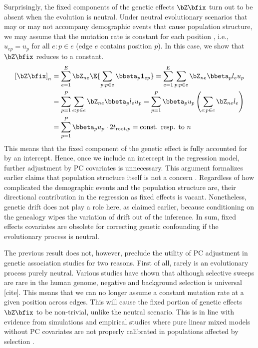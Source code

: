 Surprisingly, the fixed components of the genetic effects $\bZ\bfix$ turn out to be absent when the evolution is neutral.
Under neutral evolutionary scenarios that may or may not accompany demographic events that cause population structure, 
we may assume that the mutation rate is constant for each position \citep{wakeley2008coalescent, durrett2008probabilitydna},
i.e., $u_{ep} = u_p$ for all $e: p\in e$ (edge $e$ contains position $p$). 
In this case, we show that $\bZ\bfix$ reduces to a constant.
\begin{align} 
    \begin{aligned}
        \left[\bZ \bfix \right]_n 
        &= \sum_{e=1}^E \bZ_{ne} \E{ \sum_{p:p\in e} \bbeta_p \mathbf{1}_{ep}}  
        = \sum_{e=1}^E \sum_{p:p\in e} \bZ_{ne} \bbeta_p l_eu_p  \\
        &= \sum_{p=1}^P \sum_{e:p\in e} \bZ_{ne} \bbeta_p l_eu_p 
        = \sum_{p=1}^P \bbeta_p u_p \left(\sum_{e:p\in e} \bZ_{ne}  l_e \right) \\ 
        &= \sum_{p=1}^P \bbeta_p u_p \cdot 2t_{\mathrm{root},p}
        = \text{const. resp. to $n$}
    \end{aligned}
\end{align}
This means that the fixed component of the genetic effect is fully accounted for by an intercept.
Hence, once we include an intercept in the regression model, 
further adjustment by PC covariates is unnecessary. 
This argument formalizes earlier claims that population structure itself is not a concern \citep{vilhjlmsson2012natureconfounding, edge2013windfalls}.
Regardless of how complicated the demographic events and the population structure are, 
their directional contribution in the regression as fixed effects is vacant.
Nonetheless, genetic drift does not play a role here, as claimed earlier, because conditioning on the genealogy wipes the variation of drift out of the inference. 
In sum, fixed effects covariates are obsolete for correcting genetic confounding if the evolutionary process is neutral.

The previous result does not, however, preclude the utility of PC adjustment in genetic association studies for two reasons.
First of all, rarely is an evolutionary process purely neutral.
Various studies have shown that although selective sweeps are rare in the human genome,
negative and background selection is universal [cite].
This means that we can no longer assume a constant mutation rate at a given position across edges.
This will cause the fixed portion of genetic effects $\bZ\bfix$ to be non-trivial, unlike the neutral scenario.
This is in line with evidence from simulations and empirical studies where pure linear mixed models without PC covariates
are not properly calibrated in populations affected by selection \citep{price2010popstrat, sul2013selection, price2013response, vilhjlmsson2012natureconfounding, edge2013windfalls}.


